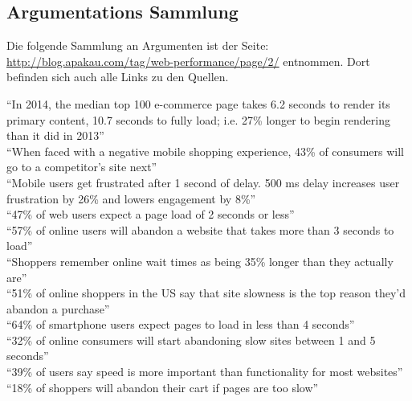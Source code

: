 

	\subsection{Argumentations Sammlung} %
	\label{sub:argumentations_sammlung}
	Die folgende Sammlung an Argumenten ist der Seite: \url{http://blog.apakau.com/tag/web-performance/page/2/} entnommen. Dort befinden sich auch alle Links zu den Quellen.\\
	\linebreak

	“In 2014, the median top 100 e-commerce page takes 6.2 seconds to render its primary content, 10.7 seconds to fully load; i.e. 27\% longer to begin rendering than it did in 2013”\\

	“When faced with a negative mobile shopping experience, 43\% of consumers will go to a competitor’s site next”\\

	“Mobile users get frustrated after 1 second of delay. 500 ms delay increases user frustration by 26\% and lowers engagement by 8\%”\\

	“47\% of web users expect a page load of 2 seconds or less”\\

	“57\% of online users will abandon a website that takes more than 3 seconds to load”\\

	“Shoppers remember online wait times as being 35\% longer than they actually are”\\

	“51\% of online shoppers in the US say that site slowness is the top reason they’d abandon a purchase”\\

	“64\% of smartphone users expect pages to load in less than 4 seconds”\\

	“32\% of online consumers will start abandoning slow sites between 1 and 5 seconds”\\

	“39\% of users say speed is more important than functionality for most websites”\\

	“18\% of shoppers will abandon their cart if pages are too slow”\\


